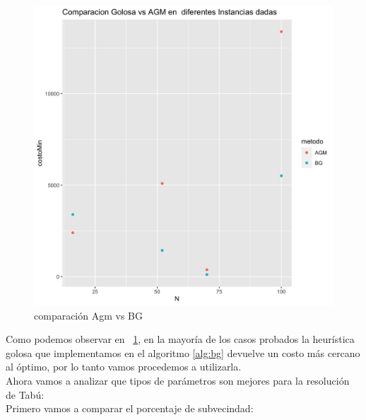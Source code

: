 \documentclass[10pt,a4paper]{article}
\begin{document}
\begin{figure} [H]
    \centering
    \includegraphics[scale=0.15]{img/AGMvsGolosa.png}
    \caption{comparación Agm vs BG}
    \label{fig:agmvsbg}
\end{figure}

Como podemos observar en ~\ref{fig:agmvsbg}, en la mayoría de los casos probados la heurística golosa que implementamos en el algoritmo \ref{alg:bg} devuelve un costo más cercano al óptimo, por lo tanto vamos procedemos a utilizarla. \\

Ahora vamos a analizar que tipos de parámetros son mejores para la resolución de Tabú: \\

Primero vamos a comparar el porcentaje de subvecindad: 
\end{document}
